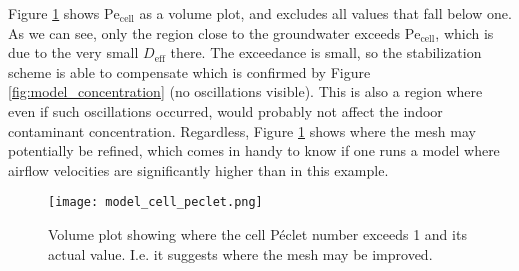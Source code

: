 Figure \ref{fig:model_cell_peclet} shows $\mathrm{Pe_{cell}}$ as a volume plot, and excludes all values that fall below one.
As we can see, only the region close to the groundwater exceeds $\mathrm{Pe_{cell}}$, which is due to the very small $D_\mathrm{eff}$ there.
The exceedance is small, so the stabilization scheme is able to compensate which is confirmed by Figure \ref{fig:model_concentration} (no oscillations visible).
This is also a region where even if such oscillations occurred, would probably not affect the indoor contaminant concentration.
Regardless, Figure \ref{fig:model_cell_peclet} shows where the mesh may potentially be refined, which comes in handy to know if one runs a model where airflow velocities are significantly higher than in this example.\par

\begin{figure}[htb!]
  \texttt{[image: model\_cell\_peclet.png]}
  \caption{Volume plot showing where the cell Péclet number exceeds 1 and its actual value. I.e. it suggests where the mesh may be improved.}
  \label{fig:model_cell_peclet}
\end{figure}
